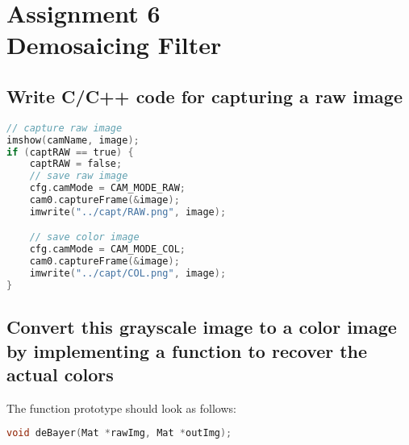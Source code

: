 \section {Assignment 6 \\ {Demosaicing Filter}}
\label {sec:assignment_6}

\subsection{Write C/C++ code for capturing a raw image}

\begin{lstlisting}[language=C, caption=save image to file, label=lst:rawcode]
// capture raw image
imshow(camName, image);
if (captRAW == true) {
    captRAW = false;
    // save raw image
    cfg.camMode = CAM_MODE_RAW;
    cam0.captureFrame(&image);
    imwrite("../capt/RAW.png", image);

    // save color image
    cfg.camMode = CAM_MODE_COL;
    cam0.captureFrame(&image);
    imwrite("../capt/COL.png", image);
}
\end{lstlisting}

\subsection{Convert this grayscale image to a color image by implementing a function to recover the actual colors}
The function prototype should look as follows:
\begin{lstlisting}[language=C, caption=function prototype, label=lst:prototype]
void deBayer(Mat *rawImg, Mat *outImg);
\end{lstlisting}
